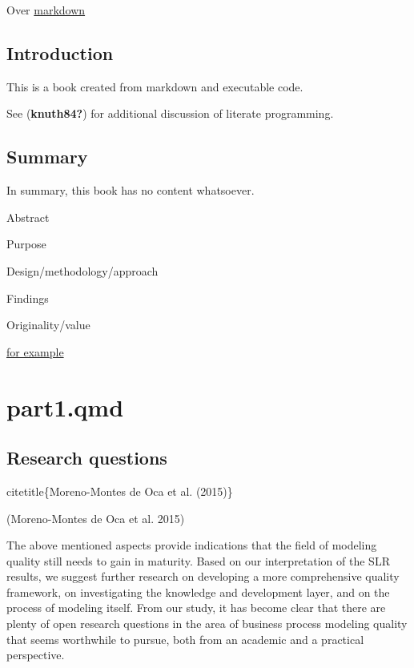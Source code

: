 \documentclass[
  letterpaper,
  DIV=11,
  numbers=noendperiod]{scrreprt}
\begin{document}
Over \href{https://www.arthurperret.fr/}{markdown}


\hypertarget{introduction}{%
\chapter{Introduction}\label{introduction}}

This is a book created from markdown and executable code.

See (\textbf{knuth84?}) for additional discussion of literate
programming.


\hypertarget{summary}{%
\chapter{Summary}\label{summary}}

In summary, this book has no content whatsoever.

Abstract

Purpose

Design/methodology/approach

Findings

Originality/value

\href{}{for example}

\part{part1.qmd}

\hypertarget{research-questions}{%
\chapter{Research questions}\label{research-questions}}

citetitle\{Moreno-Montes de Oca et al. (2015)\}

(Moreno-Montes de Oca et al. 2015)

The above mentioned aspects provide indications that the field of
modeling quality still needs to gain in maturity. Based on our
interpretation of the SLR results, we suggest further research on
developing a more comprehensive quality framework, on investigating the
knowledge and development layer, and on the process of modeling itself.
From our study, it has become clear that there are plenty of open
research questions in the area of business process modeling quality that
seems worthwhile to pursue, both from an academic and a practical
perspective.
\end{document}
